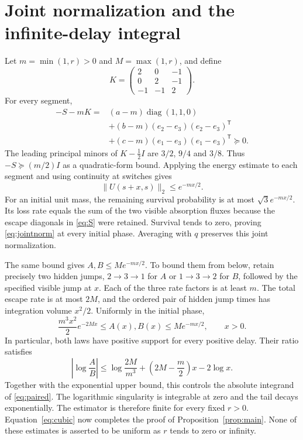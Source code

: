 \documentclass[11pt,a4paper]{article}
\DeclareMathOperator{\diag}{diag}
\begin{document}
\section{Joint normalization and the infinite-delay integral}
Let $m=\min(1,r)>0$ and $M=\max(1,r)$, and define
\begin{equation}
 K=\begin{pmatrix}2&0&-1\\0&2&-1\\-1&-1&2\end{pmatrix}.
 \label{eq:K}
\end{equation}
For every segment,
\begin{equation}
 \begin{split}
 -S-mK={}&(a-m)\diag(1,1,0)\\
 &+(b-m)(e_2-e_3)(e_2-e_3)^{\mathsf T}\\
 &+(c-m)(e_1-e_3)(e_1-e_3)^{\mathsf T}\succeq0.
 \end{split}
 \label{eq:quadratic}
\end{equation}
The leading principal minors of $K-\tfrac12 I$ are $3/2$, $9/4$ and $3/8$. Thus $-S\succeq(m/2)I$ as a quadratic-form bound. Applying the energy estimate to each segment and using continuity at switches gives
\begin{equation}
 \|U(s+x,s)\|_2\le e^{-mx/2}.
 \label{eq:contraction}
\end{equation}
For an initial unit mass, the remaining survival probability is at most $\sqrt3e^{-mx/2}$. Its loss rate equals the sum of the two visible absorption fluxes because the escape diagonals in \eqref{eq:S} were retained. Survival tends to zero, proving \eqref{eq:jointnorm} at every initial phase. Averaging with $q$ preserves this joint normalization.

The same bound gives $A,B\le M e^{-mx/2}$. To bound them from below, retain precisely two hidden jumps, $2\to3\to1$ for $A$ or $1\to3\to2$ for $B$, followed by the specified visible jump at $x$. Each of the three rate factors is at least $m$. The total escape rate is at most $2M$, and the ordered pair of hidden jump times has integration volume $x^2/2$. Uniformly in the initial phase,
\begin{equation}
 \frac{m^3x^2}{2}e^{-2Mx}\le A(x),B(x)\le M e^{-mx/2},\qquad x>0.
 \label{eq:genericbounds}
\end{equation}
In particular, both laws have positive support for every positive delay. Their ratio satisfies
\begin{equation}
 \left|\log\frac AB\right|\le
 \log\frac{2M}{m^3}+\left(2M-\frac m2\right)x-2\log x.
 \label{eq:logbounds}
\end{equation}
Together with the exponential upper bound, this controls the absolute integrand of \eqref{eq:paired}. The logarithmic singularity is integrable at zero and the tail decays exponentially. The estimator is therefore finite for every fixed $r>0$. Equation~\eqref{eq:cubic} now completes the proof of Proposition~\ref{prop:main}. None of these estimates is asserted to be uniform as $r$ tends to zero or infinity.
\end{document}
